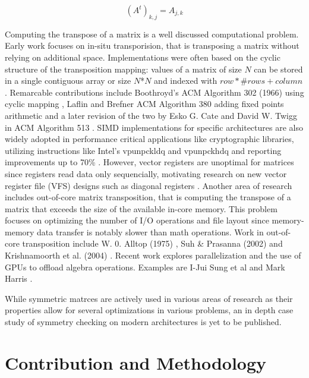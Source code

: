 \documentclass[conference]{IEEEtran}
\begin{document}
\begin{equation}
	(A^t)_{k,j} = A_{j,k}
\end{equation}

\fi

Computing the transpose of a matrix is a well discussed computational problem. Early
work focuses on in-situ transporision, that is transposing a matrix without
relying on additional space. Implementations were often based on the cyclic
structure of the transposition mapping: values of a matrix of size $N$ can be stored
in a single contiguous array or size $N$*$N$ and indexed with $row*\#rows+ column$.
Remarcable contributions include Boothroyd's ACM Algorithm 302 (1966) using cyclic mapping \cite{b13}, Laflin and Brefner ACM Algorithm 380
adding fixed points arithmetic \cite{b14} and
a later revision of the two by Esko G. Cate and David W. Twigg in ACM Algorithm 513 \cite{b15} .
SIMD implementations for specific architectures are also widely adopted
in performance critical applications like cryptographic libraries, utilizing instructions like Intel's vpunpckldq and vpunpckhdq \cite{b16} and reporting improvements up to 70\% \cite{b17}.
However, vector registers are unoptimal for matrices since registers read data only sequencially, motivating research on new vector register file (VFS) designs such as diagonal registers \cite{b23}.
Another area of research includes out-of-core matrix transposition, that
is computing the transpose of a matrix that exceeds the size of the available in-core memory.
This problem focuses on optimizing the number of I/O operations and file layout since memory-memory data transfer is notably slower than math operations. Work in out-of-core transposition include W. 0. Alltop (1975) \cite{b18}, Suh \& Prasanna (2002) \cite{b19} and Krishnamoorth et al. (2004) \cite{b20}.
Recent work explores parallelization and the use of GPUs to offload algebra operations. Examples are I-Jui Sung et al \cite{b21} and Mark Harris \cite{b22}.

While symmetric matrces are actively used in various areas of research as their
properties allow for several optimizations in various problems, an in depth case study of symmetry
checking on modern architectures is yet to be published.

\section{Contribution and Methodology}
\end{document}

